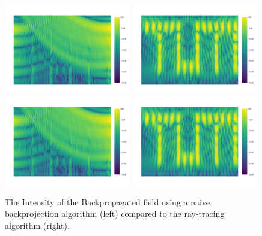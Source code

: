 \begin{figure}[p]
    \includegraphics[page=2, width=0.49\textwidth]{figures/pure_nlos_naive.pdf}
    \includegraphics[page=2, width=0.49\textwidth]{figures/pure_nlos.pdf}
    \includegraphics[page=1, width=0.49\textwidth]{figures/pure_nlos_naive.pdf}
    \includegraphics[page=1, width=0.49\textwidth]{figures/pure_nlos.pdf}
    \caption{The Intensity of the Backpropagated field using a naive backprojection algorithm (left) compared to the ray-tracing algorithm (right).}\label{fig:nlos_results}
\end{figure}

